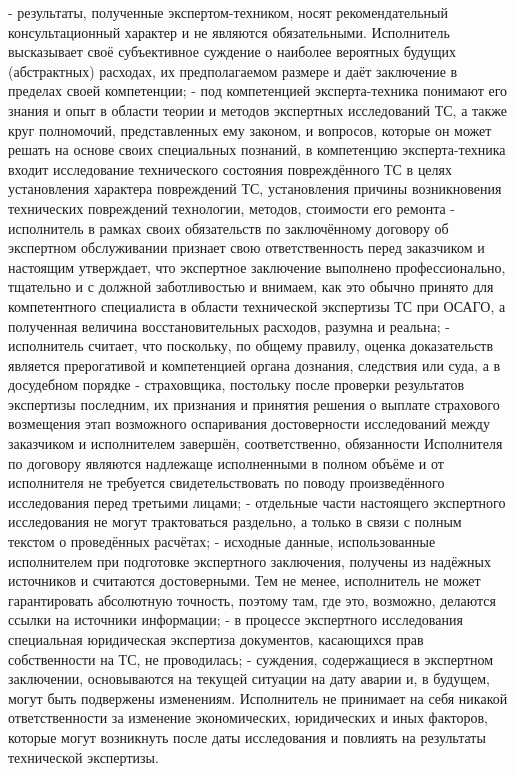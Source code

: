\noindent  - результаты, полученные экспертом-техником, носят рекомендательный консультационный характер и не являются обязательными. Исполнитель высказывает своё субъективное суждение о наиболее вероятных будущих (абстрактных) расходах, их предполагаемом размере и даёт заключение в пределах своей компетенции;
\noindent - под компетенцией эксперта-техника понимают его знания и опыт в области теории и методов экспертных исследований ТС, а также круг полномочий, представленных ему законом, и вопросов, которые он может решать на основе своих специальных познаний, в компетенцию эксперта-техника входит исследование технического состояния повреждённого ТС в целях установления характера повреждений ТС, установления причины возникновения технических повреждений технологии, методов, стоимости его ремонта
\noindent - исполнитель в рамках своих обязательств по заключённому договору об экспертном обслуживании признает свою ответственность перед заказчиком и настоящим утверждает, что экспертное заключение выполнено профессионально, тщательно и с должной заботливостью и внимаем, как это обычно принято для компетентного специалиста в области технической экспертизы ТС при ОСАГО, а полученная величина восстановительных расходов, разумна и реальна;
\noindent - исполнитель считает, что поскольку, по общему правилу, оценка доказательств является прерогативой и компетенцией органа дознания, следствия или суда, а в досудебном порядке - страховщика, постольку после проверки результатов экспертизы последним, их признания и принятия решения о выплате страхового возмещения этап возможного оспаривания достоверности исследований между заказчиком и исполнителем завершён,  соответственно, обязанности Исполнителя по договору являются надлежаще исполненными в полном объёме и от исполнителя не требуется свидетельствовать по поводу произведённого исследования перед третьими лицами;
\noindent - отдельные части настоящего экспертного исследования не могут трактоваться раздельно, а только в связи с полным текстом о проведённых расчётах;
\noindent - исходные данные, использованные исполнителем при подготовке экспертного заключения, получены из надёжных источников и считаются достоверными. Тем не менее, исполнитель не может гарантировать абсолютную точность, поэтому там, где это, возможно, делаются ссылки на источники информации;
\noindent - в процессе экспертного исследования специальная юридическая экспертиза документов, касающихся прав собственности на ТС, не проводилась;
\noindent - суждения, содержащиеся в экспертном заключении, основываются на текущей ситуации на дату аварии и, в будущем, могут быть подвержены изменениям.
Исполнитель не принимает на себя никакой ответственности за изменение экономических, юридических и иных факторов, которые могут возникнуть после даты исследования и повлиять на результаты технической экспертизы.


